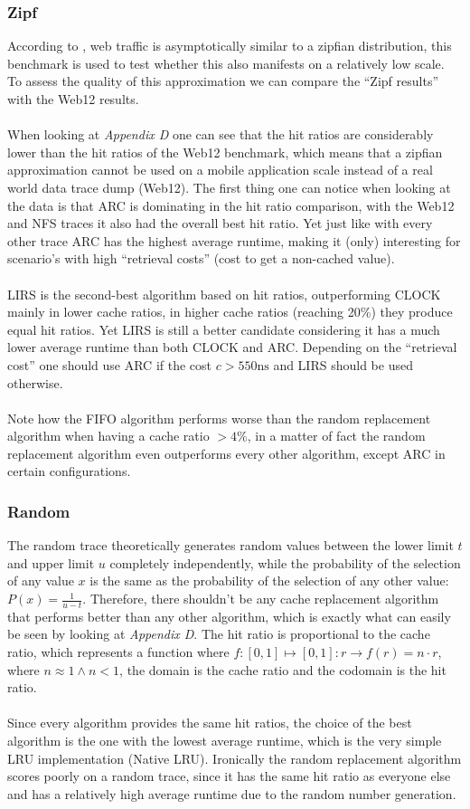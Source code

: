 \documentclass[pdftex,a4paper,12pt,twoside]{report}
\begin{document}
\subsubsection{Zipf}
According to \cite{breslau1999web}, web traffic is asymptotically similar to a zipfian distribution, this benchmark is used to test whether this also manifests on a relatively low scale. To assess the quality of this approximation we can compare the ``Zipf results'' with the Web12 results.
\\\\
When looking at \emph{Appendix D} one can see that the hit ratios are considerably lower than the hit ratios of the Web12 benchmark, which means that a zipfian approximation cannot be used on a mobile application scale instead of a real world data trace dump (Web12). The first thing one can notice when looking at the data is that ARC is dominating in the hit ratio comparison, with the Web12 and NFS traces it also had the overall best hit ratio. Yet just like with every other trace ARC has the highest average runtime, making it (only) interesting for scenario's with high ``retrieval costs'' (cost to get a non-cached value).
\\\\
LIRS is the second-best algorithm based on hit ratios, outperforming CLOCK mainly in lower cache ratios, in higher cache ratios (reaching 20\%) they produce equal hit ratios. Yet LIRS is still a better candidate considering it has a much lower average runtime than both CLOCK and ARC. Depending on the ``retrieval cost'' one should use ARC if the cost $c > 550\text{ns}$ and LIRS should be used otherwise.
\\\\
Note how the FIFO algorithm performs worse than the random replacement algorithm when having a cache ratio $> 4\%$, in a matter of fact the random replacement algorithm even outperforms every other algorithm, except ARC in certain configurations.
\subsubsection{Random}
The random trace theoretically generates random values between the lower limit $t$ and upper limit $u$ completely independently, while the probability of the selection of any value $x$ is the same as the probability of the selection of any other value: $P(x) = \frac{1}{u - t}$. Therefore, there shouldn't be any cache replacement algorithm that performs better than any other algorithm, which is exactly what can easily be seen by looking at \emph{Appendix D}. The hit ratio is proportional to the cache ratio, which represents a function where $f : [0,1] \mapsto [0,1] : r \to f(r) = n\cdot r$, where $n \approx 1 \land n < 1$, the domain is the cache ratio and the codomain is the hit ratio.
\\\\
Since every algorithm provides the same hit ratios, the choice of the best algorithm is the one with the lowest average runtime, which is the very simple LRU implementation (Native LRU). Ironically the random replacement algorithm scores poorly on a random trace, since it has the same hit ratio as everyone else and has a relatively high average runtime due to the random number generation.
\end{document}
